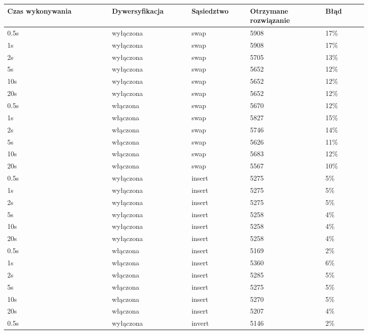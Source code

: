 \documentclass[12pt,a4paper,titlepage]{article}
\begin{document}
\begin{table}[H]
    \centering
	{\begin{tabular}{|p{0.25\linewidth}p{0.19\linewidth}p{0.14\linewidth}p{0.18\linewidth}p{0.1\linewidth}|}
		\hline
        Czas wykonywania & Dywersyfikacja & Sąsiedztwo & Otrzymane rozwiązanie & Błąd \\
		\hline
        0.5s & wyłączona & swap & 5908 & 17\% \\
        1s & wyłączona & swap & 5908 & 17\% \\
        2s & wyłączona & swap & 5705 & 13\% \\
        5s & wyłączona & swap & 5652 & 12\% \\
        10s & wyłączona & swap & 5652 & 12\% \\
        20s & wyłączona & swap & 5652 & 12\% \\
        \hline
        0.5s & włączona & swap & 5670 & 12\% \\
        1s & włączona & swap & 5827 & 15\% \\
        2s & włączona & swap & 5746 & 14\% \\
        5s & włączona & swap & 5626 & 11\% \\
        10s & włączona & swap & 5683 & 12\% \\
        20s & włączona & swap & 5567 & 10\% \\
		\hline
		0.5s & wyłączona & insert & 5275 & 5\% \\
        1s & wyłączona & insert & 5275 & 5\% \\
        2s & wyłączona & insert & 5275 & 5\% \\
        5s & wyłączona & insert & 5258 & 4\% \\
        10s & wyłączona & insert & 5258 & 4\% \\
        20s & wyłączona & insert & 5258 & 4\% \\
        \hline
        0.5s & włączona & insert & 5169 & 2\% \\
        1s & włączona & insert & 5360 & 6\% \\
        2s & włączona & insert & 5285 & 5\% \\
        5s & włączona & insert & 5275 & 5\% \\
        10s & włączona & insert & 5270 & 5\% \\
        20s & włączona & insert & 5207 & 4\% \\
        \hline
		0.5s & wyłączona & invert & 5146 & 2\% \\

\end{tabular}}
\end{table}
\end{document}
